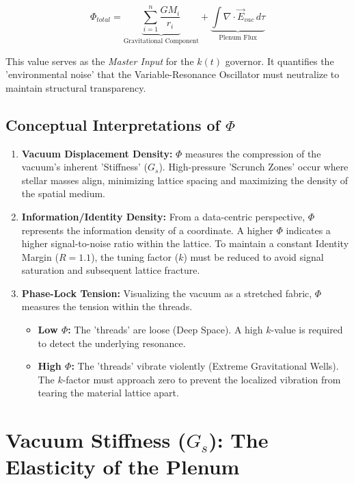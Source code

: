 \documentclass[11pt]{article}
\begin{document}
\begin{equation}
    \Phi_{total} = \underbrace{\sum_{i=1}^{n} \frac{G M_i}{r_i}}_{\text{Gravitational Component}} + \underbrace{\int \nabla \cdot \vec{E}_{vac} \, d\tau}_{\text{Plenum Flux}}
\end{equation}

This value serves as the \textit{Master Input} for the $k(t)$ governor. It quantifies the 'environmental noise' that the Variable-Resonance Oscillator must neutralize to maintain structural transparency.

\subsection{Conceptual Interpretations of $\Phi$}

\begin{enumerate}
    \item \textbf{Vacuum Displacement Density:} $\Phi$ measures the compression of the vacuum's inherent 'Stiffness' ($G_s$). High-pressure 'Scrunch Zones' occur where stellar masses align, minimizing lattice spacing and maximizing the density of the spatial medium.
    
    \item \textbf{Information/Identity Density:} From a data-centric perspective, $\Phi$ represents the information density of a coordinate. A higher $\Phi$ indicates a higher signal-to-noise ratio within the lattice. To maintain a constant Identity Margin ($R = 1.1$), the tuning factor ($k$) must be reduced to avoid signal saturation and subsequent lattice fracture.
    
    \item \textbf{Phase-Lock Tension:} Visualizing the vacuum as a stretched fabric, $\Phi$ measures the tension within the threads. 
    \begin{itemize}
        \item \textbf{Low $\Phi$:} The 'threads' are loose (Deep Space). A high $k$-value is required to detect the underlying resonance.
        \item \textbf{High $\Phi$:} The 'threads' vibrate violently (Extreme Gravitational Wells). The $k$-factor must approach zero to prevent the localized vibration from tearing the material lattice apart.
    \end{itemize}
\end{enumerate}

\section{Vacuum Stiffness ($G_s$): The Elasticity of the Plenum}
\end{document}
